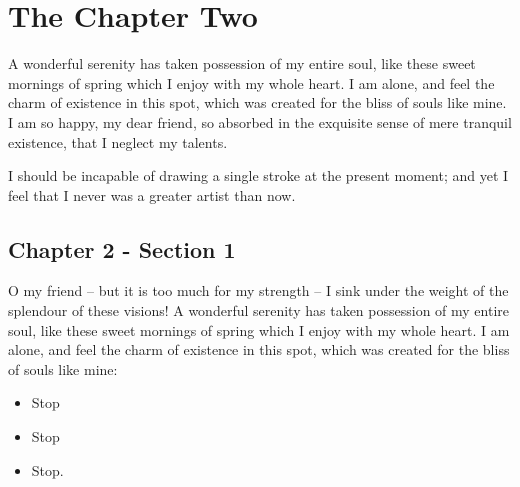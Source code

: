 
\chapter{The Chapter Two}
\label{Chapter 2}
%
A wonderful serenity has taken possession of my entire soul, like these sweet mornings of spring which I enjoy with my whole heart. I am alone, and feel the charm of existence in this spot, which was created for the bliss of souls like mine. I am so happy, my dear friend, so absorbed in the exquisite sense of mere tranquil existence, that I neglect my talents.

I should be incapable of drawing a single stroke at the present moment; and yet I feel that I never was a greater artist than now.


\section{Chapter 2 - Section 1}
\label{Chapter_2_-_Section_1}
%
O my friend -- but it is too much for my strength -- I sink under the weight of the splendour of these visions! A wonderful serenity has taken possession of my entire soul, like these sweet mornings of spring which I enjoy with my whole heart. I am alone, and feel the charm of existence in this spot, which was created for the bliss of souls like mine:

\begin{itemize}
  \item Stop
  \item Stop
  \item Stop.
\end{itemize}

